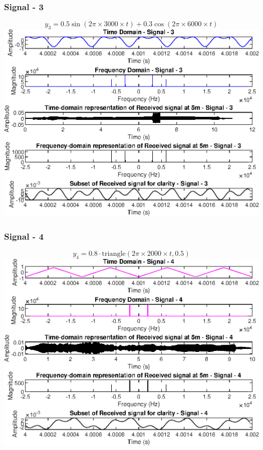 \documentclass{report}
\begin{document}
\newpage
\subsubsection{Signal - 3}

$$ y_3 = 0.5 \sin(2\pi \times 3000 \times t) + 0.3 \cos(2\pi \times 6000 \times t) $$
\includegraphics[width=1.1\linewidth]{5_3.eps}


\newpage
\subsubsection{Signal - 4}

$$ y_4 = 0.8 \cdot \text{triangle}(2 \pi \times 2000 \times t, 0.5) $$
\includegraphics[width=1.1\linewidth]{5_4.eps}
\end{document}

